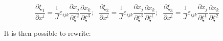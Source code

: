 \[\frac{{\partial {\xi _1}}}{{\partial {x^i}}} = \frac{1}{J}{\varepsilon _{ijk}}\frac{{\partial {x_j}}}{{\partial {\xi ^2}}}\frac{{\partial {x_k}}}{{\partial {\xi ^3}}};\,\,\,\,\frac{{\partial {\xi _2}}}{{\partial {x^i}}} = \frac{1}{J}{\varepsilon _{ijk}}\frac{{\partial {x_j}}}{{\partial {\xi ^3}}}\frac{{\partial {x_k}}}{{\partial {\xi ^1}}};\,\,\,\,\frac{{\partial {\xi _3}}}{{\partial {x^i}}} = \frac{1}{J}{\varepsilon _{ijk}}\frac{{\partial {x_j}}}{{\partial {\xi ^1}}}\frac{{\partial {x_k}}}{{\partial {\xi ^2}}}\]

It is then possible to rewrite:

